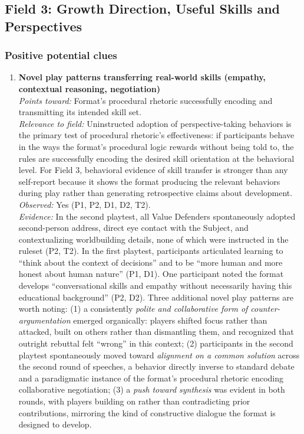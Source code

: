 \bigskip

\subsection*{Field 3: Growth Direction, Useful Skills and Perspectives}

\subsubsection*{Positive potential clues}

\begin{enumerate}

\item \textbf{Novel play patterns transferring real-world skills (empathy, contextual reasoning, negotiation)}\\
\textit{Points toward:} Format's procedural rhetoric successfully encoding and transmitting its intended skill set.\\
\textit{Relevance to field:} Uninstructed adoption of perspective-taking behaviors is the primary test of procedural rhetoric's effectiveness: if participants behave in the ways the format's procedural logic rewards without being told to, the rules are successfully encoding the desired skill orientation at the behavioral level. For Field 3, behavioral evidence of skill transfer is stronger than any self-report because it shows the format producing the relevant behaviors during play rather than generating retrospective claims about development.\\
\textit{Observed:} Yes (P1, P2, D1, D2, T2).\\
\textit{Evidence:} In the second playtest, all Value Defenders spontaneously adopted second-person address, direct eye contact with the Subject, and contextualizing worldbuilding details, none of which were instructed in the ruleset (P2, T2). In the first playtest, participants articulated learning to ``think about the context of decisions'' and to be ``more human and more honest about human nature'' (P1, D1). One participant noted the format develops ``conversational skills and empathy without necessarily having this educational background'' (P2, D2). Three additional novel play patterns are worth noting: (1) a consistently \textit{polite and collaborative form of counter-argumentation} emerged organically: players shifted focus rather than attacked, built on others rather than dismantling them, and recognized that outright rebuttal felt ``wrong'' in this context; (2) participants in the second playtest spontaneously moved toward \textit{alignment on a common solution} across the second round of speeches, a behavior directly inverse to standard debate and a paradigmatic instance of the format's procedural rhetoric encoding collaborative negotiation; (3) a \textit{push toward synthesis} was evident in both rounds, with players building on rather than contradicting prior contributions, mirroring the kind of constructive dialogue the format is designed to develop.\\

\end{enumerate}
